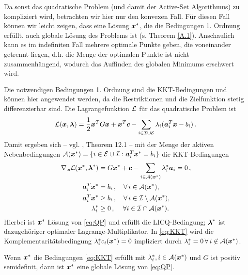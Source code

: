 Da sonst das quadratische Problem (und damit der Active-Set Algorithmus) zu kompliziert wird, betrachten wir hier nur den konvexen Fall. Für diesen Fall können wir leicht zeigen, dass eine Lösung $\boldsymbol x^*$, die die Bedingungen 1. Ordnung erfüllt, auch globale Lösung des Problems ist (s. Theorem \ref{A.1}). Anschaulich kann es im indefiniten Fall mehrere optimale Punkte geben, die voneinander getrennt liegen, d.h. die Menge der optimalen Punkte ist nicht zusammenhängend, wodurch das Auffinden des globalen Minimums erschwert wird.

Die notwendigen Bedingungen 1. Ordnung sind die KKT-Bedingungen und können hier angewendet werden, da die Restriktionen und die Zielfunktion stetig differenzierbar sind. Die Lagrangefunktion $\mathcal L$ für das quadratische Problem ist
\begin{align}
	\mathcal L(\boldsymbol x,\boldsymbol\lambda) = \frac 1 2 \boldsymbol x^T G \boldsymbol x + \boldsymbol x^T \boldsymbol c- \sum_{i \in \mathcal I \cup \mathcal E} \lambda_i (\boldsymbol a_i^T \boldsymbol x-b_i) \, .
\end{align}
Damit ergeben sich –  vgl. \cite{NocWri}, Theorem 12.1 – mit der Menge der aktiven Nebenbedingungen $\mathcal A(\boldsymbol x^*) = \{i\in \mathcal E \cup \mathcal I : \boldsymbol a_i^T \boldsymbol x^* = b_i\}$ die KKT-Bedingungen
\begin{align}\label{eq:KKT}
\begin{aligned}
	\nabla_{\boldsymbol x} \mathcal L(\boldsymbol x^*,\boldsymbol \lambda^*) & = G\boldsymbol x^*+\boldsymbol c-\sum_{i \in \mathcal A(\boldsymbol x^*)} \lambda^*_i \boldsymbol a_i  = 0 \, , \\
	\boldsymbol a_i^T \boldsymbol x^* &  = b_i \, , \quad \forall \, i \in \mathcal A(\boldsymbol x^*) , \\
	\boldsymbol a_i^T \boldsymbol x^* &  \ge b_i \, , \quad \forall \, i \in \mathcal I \setminus \mathcal A(\boldsymbol x^*) ,\\
	\lambda_i^* & \ge 0 \, , \quad \, \forall i \in \mathcal I \cap \mathcal A(\boldsymbol x^*) .
\end{aligned}
\end{align}
Hierbei ist $\boldsymbol x^*$ Lösung von \eqref{eq:QP} und erfüllt die LICQ-Bedingung; $\boldsymbol\lambda^*$ ist dazugehöriger optimaler Lagrange-Multiplikator. In \eqref{eq:KKT} wird die Komplementaritätsbedingung $\lambda^*_i c_i(\boldsymbol x^*) = 0$ impliziert durch $\lambda_i^* = 0 \, \forall \, i \not\in \mathcal A(\boldsymbol x^*)$.

\begin{theorem}\label{theorem:B.1}
Wenn $\boldsymbol x^*$ die Bedingungen \textnormal{\eqref{eq:KKT}} erfüllt mit $\lambda_i^*,i \in \mathcal A(\boldsymbol x^*)$ und $G$ ist positiv semidefinit, dann ist $\boldsymbol x^*$ eine globale Lösung von \textnormal{\eqref{eq:QP}}.
\end{theorem}

